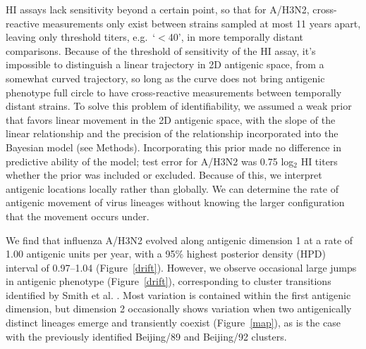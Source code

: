 \documentclass[11pt,oneside,letterpaper]{article}
\begin{document}
HI assays lack sensitivity beyond a certain point, so that for A/H3N2, cross-reactive measurements only exist between strains sampled at most 11 years apart, leaving only threshold titers, e.g.\ `$<$40', in more temporally distant comparisons.  
Because of the threshold of sensitivity of the HI assay, it's impossible to distinguish a linear trajectory in 2D antigenic space, from a somewhat curved trajectory, so long as the curve does not bring antigenic phenotype full circle to have cross-reactive measurements between temporally distant strains.
To solve this problem of identifiability, we assumed a weak prior that favors linear movement in the 2D antigenic space, with the slope of the linear relationship and the precision of the relationship incorporated into the Bayesian model (see Methods).
Incorporating this prior made no difference in predictive ability of the model; test error for A/H3N2 was 0.75 log$_2$ HI titers whether the prior was included or excluded.
Because of this, we interpret antigenic locations locally rather than globally.
We can determine the rate of antigenic movement of virus lineages without knowing the larger configuration that the movement occurs under.
 
We find that influenza A/H3N2 evolved along antigenic dimension 1 at a rate of 1.00 antigenic units per year, with a 95\% highest posterior density (HPD) interval of 0.97--1.04 (Figure~\ref{drift}).
However, we observe occasional large jumps in antigenic phenotype (Figure~\ref{drift}), corresponding to cluster transitions identified by Smith et al. \cite{Smith04}.  
Most variation is contained within the first antigenic dimension, but dimension 2 occasionally shows variation when two antigenically distinct lineages emerge and transiently coexist (Figure~\ref{map}), as is the case with the previously identified Beijing/89 and Beijing/92 clusters.
\end{document}

